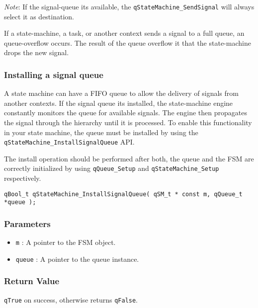 \begin{tcolorbox}
\ArrowBoldDownRight \textit{Note}: If the signal-queue its available, the \lstinline{qStateMachine_SendSignal} will always select it as destination.
\end{tcolorbox}

\begin{tcolorbox}
\ArrowBoldDownRight If a state-machine, a task, or another context sends a signal to a full queue, an queue-overflow occurs. The result of the queue overflow it that the state-machine drops the new signal. 
\end{tcolorbox}

\subsubsection{Installing a signal queue}
A state machine can have a FIFO queue to allow the delivery of signals from another contexts. If the signal queue its installed, the state-machine engine constantly monitors the queue for available signals. The engine then propagates the signal through the hierarchy until it is processed. 
To enable this functionality in your state machine, the queue must be installed by using the \lstinline{qStateMachine_InstallSignalQueue} API.

The install operation should be performed after both, the queue and the FSM are correctly initialized by using \lstinline{qQueue_Setup} and \lstinline{qStateMachine_Setup} respectively.
\medskip

\begin{lstlisting}[style=CStyle]
qBool_t qStateMachine_InstallSignalQueue( qSM_t * const m, qQueue_t *queue );
\end{lstlisting} 

\subsubsection*{Parameters}
\begin{itemize}
    \item \lstinline{m} : A pointer to the FSM object. 
    \item \lstinline{queue} : A pointer to the queue instance. 
\end{itemize}

\subsubsection*{Return Value}
\lstinline{qTrue} on success, otherwise returns \lstinline{qFalse}.

